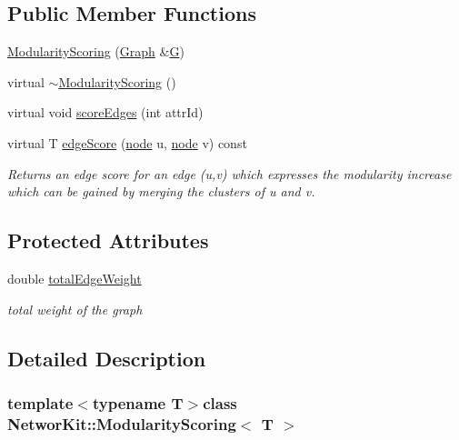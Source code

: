 \subsection*{Public Member Functions}
\begin{DoxyCompactItemize}
\item 
\hyperlink{class_networ_kit_1_1_modularity_scoring_a0150d4dbef0af9e530410f4b2d98f144}{Modularity\-Scoring} (\hyperlink{class_networ_kit_1_1_graph}{Graph} \&\hyperlink{class_networ_kit_1_1_edge_scoring_a236d40c30ccbb022125d3dc915865d8a}{G})
\item 
virtual \hyperlink{class_networ_kit_1_1_modularity_scoring_a153adadf776bcb6ad8f3f946b5db5982}{$\sim$\-Modularity\-Scoring} ()
\item 
virtual void \hyperlink{class_networ_kit_1_1_modularity_scoring_a9c93ca2ca6126a4de8a2c3c196828116}{score\-Edges} (int attr\-Id)
\item 
virtual T \hyperlink{class_networ_kit_1_1_modularity_scoring_af1b95cbb6082e5159d080c392679708a}{edge\-Score} (\hyperlink{namespace_networ_kit_a53fe3e4fd04ea024160e4d024dfebadf}{node} u, \hyperlink{namespace_networ_kit_a53fe3e4fd04ea024160e4d024dfebadf}{node} v) const 
\begin{DoxyCompactList}\small\item\em Returns an edge score for an edge (u,v) which expresses the modularity increase which can be gained by merging the clusters of u and v. \end{DoxyCompactList}\end{DoxyCompactItemize}
\subsection*{Protected Attributes}
\begin{DoxyCompactItemize}
\item 
double \hyperlink{class_networ_kit_1_1_modularity_scoring_ae5c47d760a0d0a78349ddc7ed14786a2}{total\-Edge\-Weight}
\begin{DoxyCompactList}\small\item\em total weight of the graph \end{DoxyCompactList}\end{DoxyCompactItemize}


\subsection{Detailed Description}
\subsubsection*{template$<$typename T$>$class Networ\-Kit\-::\-Modularity\-Scoring$<$ T $>$}



